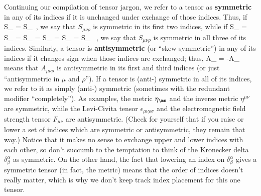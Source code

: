 \documentclass[12pt]{article}
\begin{document}
Continuing our compilation of tensor jargon, we refer to a tensor as
{\bf symmetric} in any of its indices if it is unchanged under exchange
of those indices.  Thus, if 
\be
  S_{\mu\nu\rho} = S_{\nu\mu\rho}\ ,\label{1.64}
\ee
we say that $S_{\mu\nu\rho}$ is symmetric in its first two indices, while
if
\be
  S_{\mu\nu\rho} = S_{\mu\rho\nu} = S_{\rho\mu\nu} = S_{\nu\mu\rho}
  = S_{\nu\rho\mu} = S_{\rho\nu\mu} \ ,\label{1.65}
\ee
we say that $S_{\mu\nu\rho}$ is symmetric in all three of its indices.
Similarly, a tensor is {\bf antisymmetric} (or ``skew-symmetric'') in
any of its indices if it changes sign when those indices are exchanged;
thus,
\be
  A_{\mu\nu\rho} = -A_{\rho\nu\mu}\label{1.66}
\ee
means that $A_{\mu\nu\rho}$ is antisymmetric in its first and third
indices (or just ``antisymmetric in $\mu$ and $\rho$'').  If a tensor
is (anti-) symmetric in all of its indices, we refer to it as simply
(anti-) symmetric (sometimes with the redundant modifier ``completely'').  
As examples, the metric $\eta_{\mn}$ and the inverse
metric $\eta^{\mu\nu}$ are symmetric, while the Levi-Civita tensor
$\epsilon_{\mu\nu\rho\sigma}$ and the electromagnetic field strength
tensor $F_{\mu\nu}$ are antisymmetric.  (Check for yourself that if you
raise or lower a set of indices which are symmetric or antisymmetric,
they remain that way.)  Notice that it makes no sense to exchange upper
and lower indices with each other, so don't succumb to the temptation
to think of the Kronecker delta $\delta^\alpha_\beta$ as symmetric.
On the other hand, the fact that lowering an index on $\delta^\alpha_\beta$
gives a symmetric tensor (in fact, the metric) means that the order of
indices doesn't really matter, which is why we don't keep track index
placement for this one tensor.
\end{document}
